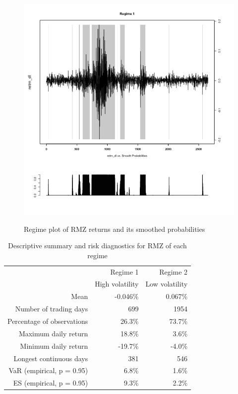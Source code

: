 \documentclass[12pt]{article}
\begin{document}
\begin{figure}[h]
\caption{Regime plot of RMZ returns and its smoothed probabilities} 
\centering 
\includegraphics[width=1\textwidth]{../results/regime/RMZ}
\label{fig: RMZregime}
\end{figure}

\begin{table}[h]
\caption{Descriptive summary and risk diagnostics for RMZ of each regime} 
\centering 
\begin{tabular}{| r | r | r |} 
 \hline
& Regime 1 & Regime 2 \\
& High volatility & Low volatility \\
 \hline 
Mean & -0.046\% & 0.067\% \\
Number of trading days & 699 & 1954\\ 
Percentage of observations & 26.3\% & 73.7\% \\ 
Maximum daily return &18.8\% & 3.6\% \\
Minimum daily return & -19.7\% & -4.0\% \\
Longest continuous days & 381 & 546\\ \hline
VaR (empirical, p = 0.95) & 6.8\% & 1.6\% \\
ES (empirical, p = 0.95) & 9.3\% & 2.2\% \\
 \hline
\end{tabular}
\label{table:statSumRegimeRMZ}
\end{table}
\end{document}
